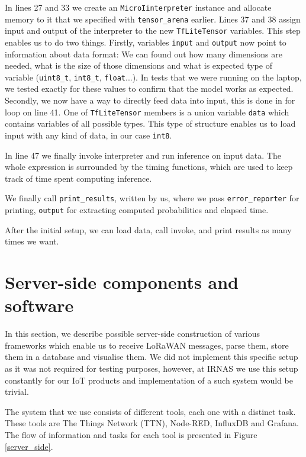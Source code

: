 \clearpage
In lines 27 and 33 we create an \verb|MicroIinterpreter| instance and allocate memory to it that we specified with \verb|tensor_arena| earlier.
Lines 37 and 38 assign input and output of the interpreter to the new \verb|TfLiteTensor| variables.
This step enables us to do two things.
Firstly, variables \verb|input| and \verb|output| now point to information about data format: We can found out how many dimensions are needed, what is the size of those dimensions and what is expected type of variable (\verb|uint8_t|, \verb|int8_t|, \verb|float|...).
In tests that we were running on the laptop, we tested exactly for these values to confirm that the model works as expected.
Secondly, we now have a way to directly feed data into input, this is done in for loop on line 41.
One of \verb|TfLiteTensor| members is a union variable \verb|data| which contains variables of all possible types.
This type of structure enables us to load input with any kind of data, in our case \verb|int8|.

In line 47 we finally invoke interpreter and run inference on input data.
The whole expression is surrounded by the timing functions, which are used to keep track of time spent computing inference.

We finally call \verb|print_results|, written by us, where we pass \verb|error_reporter| for printing, \verb|output| for extracting computed probabilities and elapsed time.

After the initial setup, we can load data, call invoke, and print results as many times we want.


\section{ Server-side components and software}

In this section, we describe possible server-side construction of various frameworks which enable us to receive LoRaWAN messages, parse them, store them in a database and visualise them.
We did not implement this specific setup as it was not required for testing purposes, however, at IRNAS we use this setup constantly for our IoT products and implementation of a such system would be trivial.

The system that we use consists of different tools, each one with a distinct task.
These tools are The Things Network (TTN), Node-RED, InfluxDB and Grafana.
The flow of information and tasks for each tool is presented in Figure \ref{server_side}.

